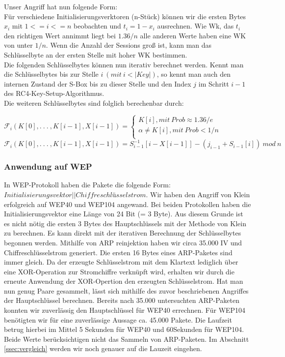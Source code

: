 \documentclass[10pt,a4paper]{article}
\begin{document}
Unser Angriff hat nun folgende Form:\\
Für verschiedene Initialisierungsverktoren (n-Stück) können wir die ersten Bytes $x_i$ mit $1 <= i <= n$ beobachten und $t_i = 1 - x_i$ ausrechnen. Wie Wk, das $t_i$ den richtigen Wert annimmt liegt bei $1.36/n$ alle anderen Werte haben eine WK von unter $1/n$. Wenn die Anzahl der Sessions groß ist, kann man das Schlüsselbyte an der ersten Stelle mit hoher WK bestimmen.\\
Die folgenden Schlüsselbytes können nun iterativ berechnet werden. Kennt man die Schlüsselbytes bis zur Stelle $i\ ( mit\  i < |Key|)$, so kennt man auch den internen Zustand der S-Box bis zu dieser Stelle und den Index $j$ im Schritt $i - 1$ des RC4-Key-Setup-Algorithmus. \\
Die weiteren Schlüsselbytes sind folglich berechenbar durch:
\begin{center}
$\mathcal{F}_i(K[0], .\ .\ .\ ,K[i-1],X[i-1]) = \begin{cases} K[i], mit \ Prob \approx 1.36/e \\ \alpha \neq K[i], mit \ Prob < 1/n \\\end{cases}$
\\\vspace{1em}
$\mathcal{F}_i(K[0], .\ .\ .\ ,K[i-1],X[i-1]) = S^{-1}_{i-1}[i-X[i-1]] - (j_{i-1}+S_{i-1}[i]) \ mod \ n$
\end{center}
 

\subsubsection{Anwendung auf WEP}
In WEP-Protokoll haben die Pakete die folgende Form: $Initialisierungsvektor || Chiffreschlüsselstrom $. Wir haben den Angriff von Klein erfolgreich auf WEP40 und WEP104 angewand. Bei beiden Protokollen haben die Initialisierungsvektor eine Länge von 24 Bit (= 3 Byte). Aus diesem Grunde ist es nicht nötig die ersten 3 Bytes des Hauptschlüssels mit der Methode von Klein zu berechnen. Es kann direkt mit der iterativen Berechnung der Schlüsselbytes begonnen werden. Mithilfe von ARP reinjektion haben wir circa 35.000 IV und Chiffreschlüsselstrom generiert. Die ersten 16 Bytes eines ARP-Paketes sind immer gleich. Da der erzeugte Schlüsselstrom mit dem Klartext lediglich über eine XOR-Operation zur Stromchiffre verknüpft wird, erhalten wir durch die erneute Anwendung der XOR-Opertion den erzeugten Schlüsselstrom. Hat man nun genug Paare gesammelt, lässt sich mithilfe des zuvor beschriebenen Angriffes der Hauptschlüssel berechnen. Bereits nach 35.000 untersuchten ARP-Paketen konnten wir zuverlässig den Hauptschlüssel für WEP40 errechnen. Für WEP104 benötigten wir für eine zuverlässige Aussage ca. 45.000 Pakete. Die Laufzeit betrug hierbei im Mittel 5 Sekunden für WEP40 und 60Sekunden für WEP104. Beide Werte berücksichtigen nicht das Sammeln von ARP-Paketen. Im Abschnitt \ref{ssec:vergleich} werden wir noch genauer auf die Lauzeit eingehen.
\end{document}

